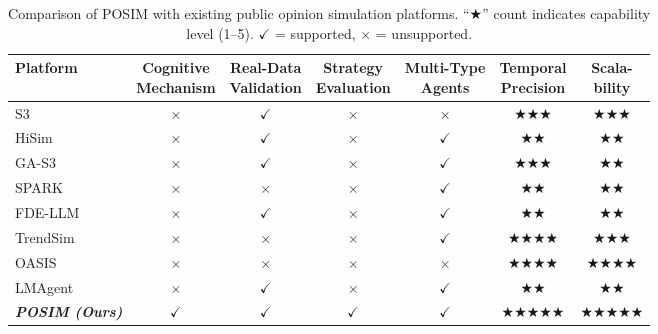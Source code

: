 \documentclass[a4paper,fleqn]{cas-sc}
\begin{document}
\begin{table}[!t]
\centering
\caption{Comparison of POSIM with existing public opinion simulation platforms. ``$\bigstar$'' count indicates capability level (1--5). $\checkmark$ = supported, $\times$ = unsupported.}
\label{tab:comparison}
\footnotesize
\renewcommand{\arraystretch}{1.0}
\begin{tabular}{@{}lcccccc@{}}
\toprule
\textbf{Platform} & \makecell{\textbf{Cognitive}\\\textbf{Mechanism}} & \makecell{\textbf{Real-Data}\\\textbf{Validation}} & \makecell{\textbf{Strategy}\\\textbf{Evaluation}} & \makecell{\textbf{Multi-Type}\\\textbf{Agents}} & \makecell{\textbf{Temporal}\\\textbf{Precision}} & \makecell{\textbf{Scala-}\\\textbf{bility}} \\
\midrule
S3~\citep{gao_s3_2023} & $\times$ & $\checkmark$ & $\times$ & $\times$ & $\bigstar\bigstar\bigstar$ & $\bigstar\bigstar\bigstar$ \\
HiSim~\citep{mou_unveiling_2024} & $\times$ & $\checkmark$ & $\times$ & $\checkmark$ & $\bigstar\bigstar$ & $\bigstar\bigstar$ \\
GA-S3~\citep{liu_agent-based_2024} & $\times$ & $\checkmark$ & $\times$ & $\checkmark$ & $\bigstar\bigstar\bigstar$ & $\bigstar\bigstar$ \\
SPARK~\citep{zhang_spark_2025} & $\times$ & $\times$ & $\times$ & $\checkmark$ & $\bigstar\bigstar$ & $\bigstar\bigstar$ \\
FDE-LLM~\citep{yao_social_2025} & $\times$ & $\checkmark$ & $\times$ & $\checkmark$ & $\bigstar\bigstar$ & $\bigstar\bigstar$ \\
TrendSim~\citep{zhang_trendsim_2025} & $\times$ & $\times$ & $\times$ & $\checkmark$ & $\bigstar\bigstar\bigstar\bigstar$ & $\bigstar\bigstar\bigstar$ \\
OASIS~\citep{yang_oasis_2025} & $\times$ & $\times$ & $\times$ & $\times$ & $\bigstar\bigstar\bigstar\bigstar$ & $\bigstar\bigstar\bigstar\bigstar$ \\
LMAgent~\citep{liu_lmagent_2026} & $\times$ & $\checkmark$ & $\times$ & $\checkmark$ & $\bigstar\bigstar$ & $\bigstar\bigstar$ \\
\midrule
\rowcolor{grayrow}
\textit{\textbf{POSIM (Ours)}} & $\checkmark$ & $\checkmark$ & $\checkmark$ & $\checkmark$ & $\bigstar\bigstar\bigstar\bigstar\bigstar$ & $\bigstar\bigstar\bigstar\bigstar\bigstar$ \\
\bottomrule
\end{tabular}
\end{table}
\end{document}
